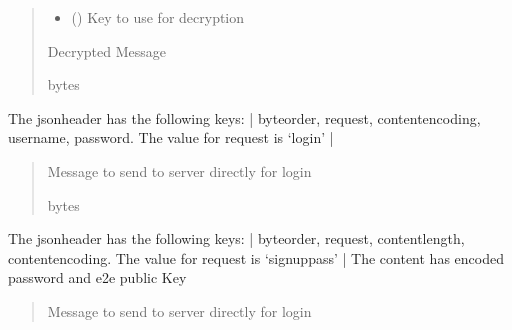 \documentclass[letterpaper,10pt,english]{sphinxmanual}
\begin{document}
\begin{fulllineitems}
\begin{fulllineitems}
\begin{quote}
\begin{description}
\begin{itemize}
\item {} 
\sphinxAtStartPar
{} () \textendash{} Key to use for decryption

\end{itemize}

\sphinxAtStartPar
Decrypted Message

\sphinxAtStartPar
bytes

\end{description}\end{quote}

\end{fulllineitems}


\begin{fulllineitems}
\label{\detokenize{Message:Message.Message._create_login_request}}
\pysigstartsignatures
{}
\pysigstopsignatures
\sphinxAtStartPar
The jsonheader has the following keys: |
byteorder, request, content\sphinxhyphen{}encoding, username, password. The value for request is ‘login’ |
\begin{quote}\begin{description}
\sphinxAtStartPar
Message to send to server directly for login

\sphinxAtStartPar
bytes

\end{description}\end{quote}

\end{fulllineitems}


\begin{fulllineitems}
\label{\detokenize{Message:Message.Message._create_signuppass_request}}
\pysigstartsignatures
{}
\pysigstopsignatures
\sphinxAtStartPar
The jsonheader has the following keys: |
byteorder, request, content\sphinxhyphen{}length, content\sphinxhyphen{}encoding. The value for request is ‘signuppass’ |
The content has encoded password and e2e public Key
\begin{quote}\begin{description}
\sphinxAtStartPar
Message to send to server directly for login


\end{description}
\end{quote}
\end{fulllineitems}
\end{fulllineitems}
\end{document}
